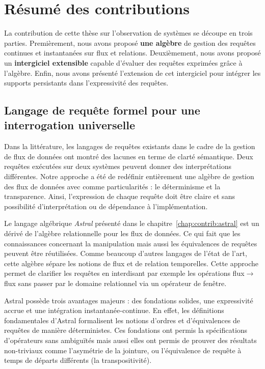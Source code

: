 \section{Résumé des contributions}\label{sec:conclusion:contributions}
La contribution de cette thèse sur l'observation de systèmes se découpe en trois parties. Premièrement, nous avons proposé \textbf{une algèbre} de gestion des requêtes continues et instantanées sur flux et relations. Deuxièmement, nous avons proposé un \textbf{intergiciel extensible} capable d'évaluer des requêtes exprimées grâce à l'algèbre. Enfin, nous avons présenté l'extension de cet intergiciel pour intégrer les supports persistants dans l'expressivité des requêtes.

\subsection{Langage de requête formel pour une interrogation universelle}
Dans la littérature, les langages de requêtes existants dans le cadre de la gestion de flux de données ont montré des lacunes en terme de clarté sémantique. Deux requêtes exécutées sur deux systèmes peuvent donner des interprétations différentes. Notre approche a été de redéfinir entièrement une algèbre de gestion des flux de données avec comme particularités : le déterminisme et la transparence. Ainsi, l'expression de chaque requête doit être claire et sans possibilité d'interprétation ou de dépendance à l'implémentation.

Le langage algébrique \textit{Astral} présenté dans le chapitre~\ref{chap:contrib:astral} est un dérivé de l'algèbre relationnelle pour les flux de données. Ce qui fait que les connaissances concernant la manipulation mais aussi les équivalences de requêtes peuvent être réutilisées. Comme beaucoup d'autres langages de l'état de l'art, cette algèbre sépare les notions de flux et de relation temporelles. Cette approche permet de clarifier les requêtes en interdisant par exemple les opérations flux$\to$flux sans passer par le domaine relationnel via un opérateur de fenêtre.

Astral possède trois avantages majeurs : des fondations solides, une expressivité accrue et une intégration instantanée-continue. En effet, les définitions fondamentales d'Astral formalisent les notions d'ordres et d'équivalences de requêtes de manière déterministes. Ces fondations ont permis la spécifications d'opérateurs sans ambiguïtés mais aussi elles ont permis de prouver des résultats non-triviaux comme l'asymétrie de la jointure, ou l'équivalence de requête à temps de départs différents (la transpositivité).

